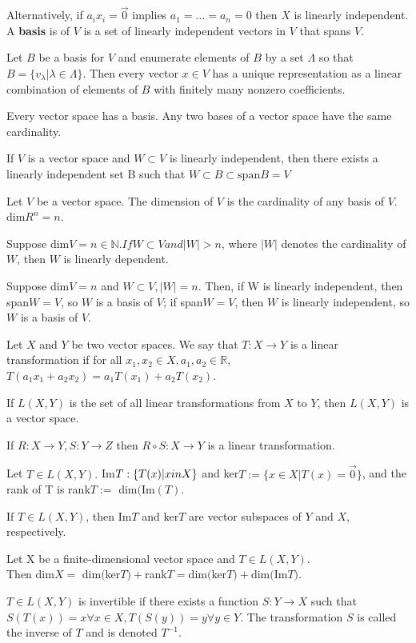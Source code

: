 \documentclass[11pt]{article} %
\begin{document}
Alternatively, if $a_i x_i = \vec{0}$ implies $a_1 = \dots =a_n  =0 $ then $X$ is linearly independent. A \textbf{basis} is of $V$ is a set of linearly independent vectors in $V$ that spans $V$.

Let $B$ be a basis for $V$ and enumerate elements of $B$ by a set $\Lambda$ so that $B = \{ v_{\lambda} | \lambda \in \Lambda\}.$ Then every vector $x \in V$ has a unique representation as a linear combination of elements of $B$ with finitely many nonzero coefficients.

Every vector space has a basis. Any two bases of a vector space have the same cardinality.

If $V$ is a vector space and $W \subset V$ is linearly independent, then there exists a linearly independent set B such that $W \subset B \subset \text{span}B = V$

Let $V$ be a vector space. The dimension of $V$ is the cardinality of any basis of $V$. dim$R^n = n.$

Suppose dim$V = n \in \mathbb{N}. If W \subset V and |W|>n$, where $|W|$ denotes the cardinality of $W$, then $W$ is linearly dependent.

Suppose dim$V = n$ and $W \subset V, |W| = n$. Then, if W is linearly independent, then span$W = V$, so $W$ is a basis of $V$; if span$W = V$, then $W$ is linearly independent, so $W$ is a basis of $V$.

Let $X$ and $Y$ be two vector spaces. We say that $T:X \rightarrow Y$ is a linear transformation if for all $x_1,x_2 \in X, a_1,a_2 \in \mathbb{R}$, $T(a_1x_1 + a_2x_2) = a_1T(x_1) + a_2T(x_2)$.

If $L(X,Y)$ is the set of all linear transformations from $X$ to $Y$, then $L(X,Y)$ is a vector space.

If $R:X\rightarrow Y, S:Y \rightarrow Z$ then $R \circ S:X \rightarrow Y$ is a linear transformation.

Let $T \in L(X,Y).$ Im$T: \{T(x)| x\\in X \}$ and ker$T:=\{ x \in X | T(x) = \vec{0}\}$, and the rank of T is rank$T := $ dim$($Im$(T)$.

If $T \in L(X,Y)$, then Im$T$ and ker$T$ are vector subspaces of $Y$ and $X$, respectively.

Let X be a finite-dimensional vector space and $T \in L(X,Y).$ \\ Then dim$X = $ dim$($ker$T) + $rank$T = $dim$($ker$T) + $dim$($Im$T).$

$T \in L(X,Y)$ is invertible if there exists a function $S:Y \rightarrow X$ such that $S(T(x)) = x \forall x \in X, T(S(y)) = y \forall y \in Y.$ The transformation $S$ is called the inverse of $T$ and is denoted $T^{-1}$.
\end{document}
